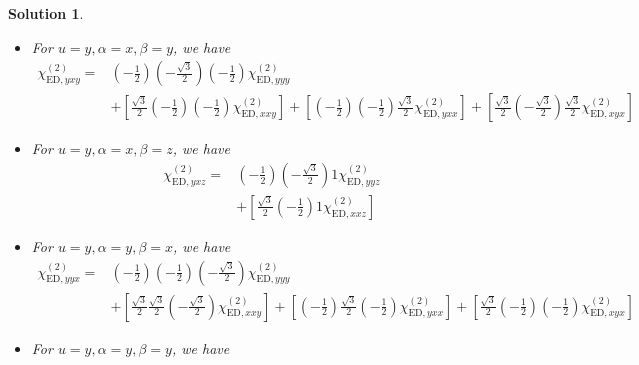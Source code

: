 \documentclass[UTF8,10pt,a4paper]{article}
\theoremstyle{Problem}
\theoremstyle{Solution}
\newtheorem*{sol}{Solution}
\begin{document}
\begin{sol}
\begin{itemize}
\begin{align}
\nonumber\chi_{\text{ED},yxx}^{(2)}=&\left(-\frac{1}{2}\right)\left(-\frac{\sqrt{3}}{2}\right)\left(-\frac{\sqrt{3}}{2}\right)\chi_{\text{ED},yyy}^{(2)}\\
&+\left[\frac{\sqrt{3}}{2}\left(-\frac{1}{2}\right)\left(-\frac{\sqrt{3}}{2}\right)\chi_{\text{ED},xxy}^{(2)}\right]+\left[\left(-\frac{1}{2}\right)\left(-\frac{1}{2}\right)\left(-\frac{1}{2}\right)\chi_{\text{ED},yxx}^{(2)}\right]+\left[\frac{\sqrt{3}}{2}\left(-\frac{\sqrt{3}}{2}\right)\left(-\frac{1}{2}\right)\chi_{\text{ED},xyx}^{(2)}\right]
\end{align}\normalsize
\item For $u=y,\alpha=x,\beta=y$, we have
\small\begin{align}
\nonumber\chi_{\text{ED},yxy}^{(2)}=&\left(-\frac{1}{2}\right)\left(-\frac{\sqrt{3}}{2}\right)\left(-\frac{1}{2}\right)\chi_{\text{ED},yyy}^{(2)}\\
&+\left[\frac{\sqrt{3}}{2}\left(-\frac{1}{2}\right)\left(-\frac{1}{2}\right)\chi_{\text{ED},xxy}^{(2)}\right]+\left[\left(-\frac{1}{2}\right)\left(-\frac{1}{2}\right)\frac{\sqrt{3}}{2}\chi_{\text{ED},yxx}^{(2)}\right]+\left[\frac{\sqrt{3}}{2}\left(-\frac{\sqrt{3}}{2}\right)\frac{\sqrt{3}}{2}\chi_{\text{ED},xyx}^{(2)}\right]
\end{align}\normalsize
\item For $u=y,\alpha=x,\beta=z$, we have
\small\begin{align}
\nonumber\chi_{\text{ED},yxz}^{(2)}=&\left(-\frac{1}{2}\right)\left(-\frac{\sqrt{3}}{2}\right)1\chi_{\text{ED},yyz}^{(2)}\\
&+\left[\frac{\sqrt{3}}{2}\left(-\frac{1}{2}\right)1\chi_{\text{ED},xxz}^{(2)}\right]
\end{align}\normalsize
\item For $u=y,\alpha=y,\beta=x$, we have
\small\begin{align}
\nonumber\chi_{\text{ED},yyx}^{(2)}=&\left(-\frac{1}{2}\right)\left(-\frac{1}{2}\right)\left(-\frac{\sqrt{3}}{2}\right)\chi_{\text{ED},yyy}^{(2)}\\
&+\left[\frac{\sqrt{3}}{2}\frac{\sqrt{3}}{2}\left(-\frac{\sqrt{3}}{2}\right)\chi_{\text{ED},xxy}^{(2)}\right]+\left[\left(-\frac{1}{2}\right)\frac{\sqrt{3}}{2}\left(-\frac{1}{2}\right)\chi_{\text{ED},yxx}^{(2)}\right]+\left[\frac{\sqrt{3}}{2}\left(-\frac{1}{2}\right)\left(-\frac{1}{2}\right)\chi_{\text{ED},xyx}^{(2)}\right]
\end{align}\normalsize
\item For $u=y,\alpha=y,\beta=y$, we have
\small\begin{align}

\end{align}
\end{itemize}
\end{sol}
\end{document}
